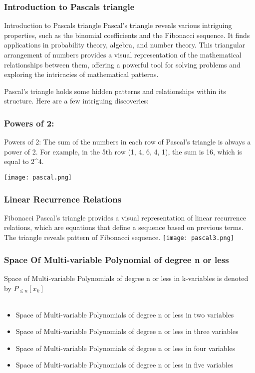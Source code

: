 \documentclass{beamer}
\begin{document}
\begin{frame}
    \frametitle{Introduction to Pascals triangle}
    \begin{block}{Introduction to Pascals triangle}
    Pascal's triangle reveals various intriguing properties, such as the binomial coefficients and the Fibonacci sequence. It finds applications in probability theory, algebra, and number theory. This triangular arrangement of numbers provides a visual representation of the mathematical relationships between them, offering a powerful tool for solving problems and exploring the intricacies of mathematical patterns.

Pascal's triangle holds some hidden patterns and relationships within its structure. Here are a few intriguing discoveries:
\end{block}
\end{frame}
\begin{frame}
\frametitle{Powers of 2: }
\begin{block}{Powers of 2: }
 The sum of the numbers in each row of Pascal's triangle is always a power of 2. For example, in the 5th row (1, 4, 6, 4, 1), the sum is 16, which is equal to 2^4.

\centering
\texttt{[image: pascal.png]}
\end{block}
\end{frame}

\begin{frame}
\frametitle{Linear Recurrence Relations }
\begin{block}{Fibonacci}
 Pascal's triangle provides a visual representation of linear recurrence relations, which are equations that define a sequence based on previous terms. The triangle reveals pattern of Fibonacci sequence.
 \centering
\texttt{[image: pascal3.png]}
\end{block}
\end{frame}
\begin{frame}
\frametitle{Space Of Multi-variable Polynomial of degree n or less}
\begin{block}{}
Space of Multi-variable Polynomials of degree n or less in k-variables is denoted by $P_{\leq n}[x_k]$\\

\\
\begin{itemize}
    \item Space of Multi-variable Polynomials of degree n or less in two variables
     \item Space of Multi-variable Polynomials of degree n or less in three variables
      \item Space of Multi-variable Polynomials of degree n or less in four variables
     \item Space of Multi-variable Polynomials of degree n or less in five variables
\end{itemize}
\end{block}
\end{frame}
\end{document}
